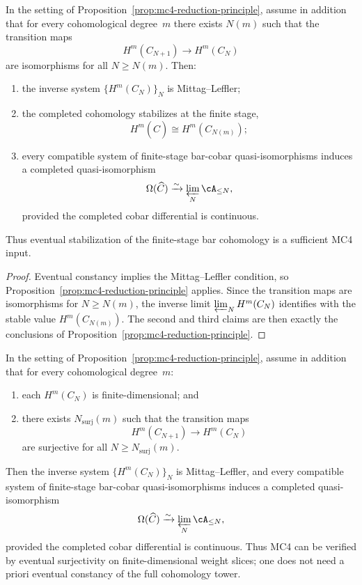 
\begin{corollary}
\label{cor:mc4-degreewise-stabilization}
In the setting of Proposition~\ref{prop:mc4-reduction-principle},
assume in addition that for every cohomological degree~$m$ there exists
$N(m)$ such that the transition maps
\[
H^m(C_{N+1}) \longrightarrow H^m(C_N)
\]
are isomorphisms for all $N \ge N(m)$.  Then:
\begin{enumerate}
\item the inverse system $\{H^m(C_N)\}_N$ is Mittag--Leffler;
\item the completed cohomology stabilizes at the finite stage,
  \[
  H^m(\widehat{C}) \cong H^m(C_{N(m)});
  \]
\item every compatible system of finite-stage bar-cobar
  quasi-isomorphisms induces a completed quasi-isomorphism
  \[
  \Omega(\widehat{C}) \xrightarrow{\sim} \varprojlim_N \cA_{\le N},
  \]
  provided the completed cobar differential is continuous.
\end{enumerate}
Thus eventual stabilization of the finite-stage bar cohomology is a
sufficient MC4 input.
\end{corollary}

\begin{proof}
Eventual constancy implies the Mittag--Leffler condition, so
Proposition~\ref{prop:mc4-reduction-principle} applies.  Since the
transition maps are isomorphisms for $N \ge N(m)$, the inverse limit
$\varprojlim_N H^m(C_N)$ identifies with the stable value
$H^m(C_{N(m)})$.  The second and third claims are then exactly the
conclusions of
Proposition~\ref{prop:mc4-reduction-principle}.
\end{proof}

\begin{corollary}
\label{cor:mc4-surjective-criterion}
In the setting of Proposition~\ref{prop:mc4-reduction-principle},
assume in addition that for every cohomological degree~$m$:
\begin{enumerate}
\item each $H^m(C_N)$ is finite-dimensional; and
\item there exists $N_{\mathrm{surj}}(m)$ such that the transition maps
  \[
  H^m(C_{N+1}) \longrightarrow H^m(C_N)
  \]
  are surjective for all $N \ge N_{\mathrm{surj}}(m)$.
\end{enumerate}
Then the inverse system $\{H^m(C_N)\}_N$ is Mittag--Leffler, and every
compatible system of finite-stage bar-cobar quasi-isomorphisms induces a
completed quasi-isomorphism
\[
\Omega(\widehat{C}) \xrightarrow{\sim} \varprojlim_N \cA_{\le N},
\]
provided the completed cobar differential is continuous.
Thus MC4 can be verified by eventual surjectivity on finite-dimensional
weight slices; one does not need a priori eventual constancy of the full
cohomology tower.
\end{corollary}

